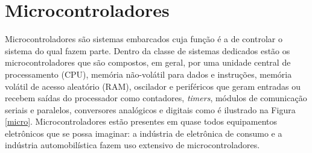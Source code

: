 


\section{Microcontroladores}

Microcontroladores são sistemas embarcados cuja função é a de controlar o sistema do qual fazem parte. Dentro da classe de sistemas dedicados estão os microcontroladores que são compostos, em geral, por uma unidade central de processamento (CPU), memória não-volátil para dados e instruções, memória volátil de acesso aleatório (RAM), oscilador e periféricos que geram entradas ou recebem saídas do processador como contadores, \textit{timers}, módulos de comunicação seriais e paralelos, conversores analógicos e digitais como é ilustrado na Figura \ref{micro}. Microcontroladores estão presentes em quase todos equipamentos eletrônicos que se possa imaginar: a indústria de eletrônica de consumo e a indústria automobilística fazem uso extensivo de microcontroladores.


